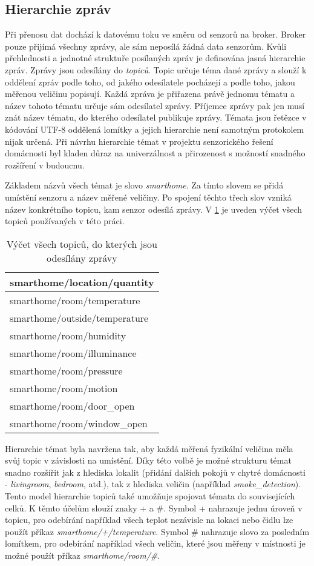 \subsection{Hierarchie zpráv} \label{subsec:message_hierarchy}
Při přenosu dat dochází k datovému toku ve směru od senzorů na broker. Broker pouze přijímá všechny zprávy, ale sám neposílá žádná data senzorům. Kvůli přehlednosti a jednotné struktuře posílaných zpráv je definována jasná hierarchie zpráv. Zprávy jsou odesílány do \textit{topiců}. Topic určuje téma dané zprávy a slouží k oddělení zpráv podle toho, od jakého odesílatele pocházejí a podle toho, jakou měřenou veličinu popisují. Každá zpráva je přiřazena právě jednomu tématu a název tohoto tématu určuje sám odesílatel zprávy. Příjemce zprávy pak jen musí znát název tématu, do kterého odesílatel publikuje zprávy. Témata jsou řetězce v kódování UTF-8 oddělená lomítky a jejich hierarchie není samotným protokolem nijak určená. Při návrhu hierarchie témat v projektu senzorického řešení domácnosti byl kladen důraz na univerzálnost a přirozenost s možností snadného rozšíření v budoucnu. \par
Základem názvů všech témat je slovo \textit{smarthome}. Za tímto slovem se přidá umístění senzoru a název měřené veličiny. Po spojení těchto třech slov vzniká název konkrétního topicu, kam senzor odesílá zprávy. V \cref{tab:mqtt_topic_structure} je uveden výčet všech topiců používaných v této práci.

\begin{table}[h]
\centering
 \begin{tabular}{|p{5.5cm}|} 
 \hline
  smarthome/location/quantity  \\
 \hline\hline
 smarthome/room/temperature \\ 
 smarthome/outside/temperature \\
 smarthome/room/humidity \\
 smarthome/room/illuminance \\
 smarthome/room/pressure \\
 smarthome/room/motion \\
 smarthome/room/door\_open \\
 smarthome/room/window\_open \\
 \hline
 \end{tabular}
 \caption{Výčet všech topiců, do kterých jsou odesílány zprávy}
 \label{tab:mqtt_topic_structure}
\end{table}

Hierarchie témat byla navržena tak, aby každá měřená fyzikální veličina měla svůj topic v závislosti na umístění. Díky této volbě je možné strukturu témat snadno rozšířit jak z hlediska lokalit (přidání dalších pokojů v chytré domácnosti - \textit{livingroom}, \textit{bedroom}, atd.), tak z hlediska veličin (například \textit{smoke\_detection}). Tento model hierarchie topiců také umožňuje spojovat témata do souvisejících celků. K těmto účelům slouží znaky + a \#. Symbol + nahrazuje jednu úroveň v topicu, pro odebírání například všech teplot nezávisle na lokaci nebo čidlu lze použít příkaz \textit{smarthome/+/temperature}. Symbol  \# nahrazuje slovo za posledním lomítkem, pro odebírání například všech veličin, které jsou měřeny v místnosti je možné použít příkaz \mbox{\textit{smarthome/room/\#}}. 

